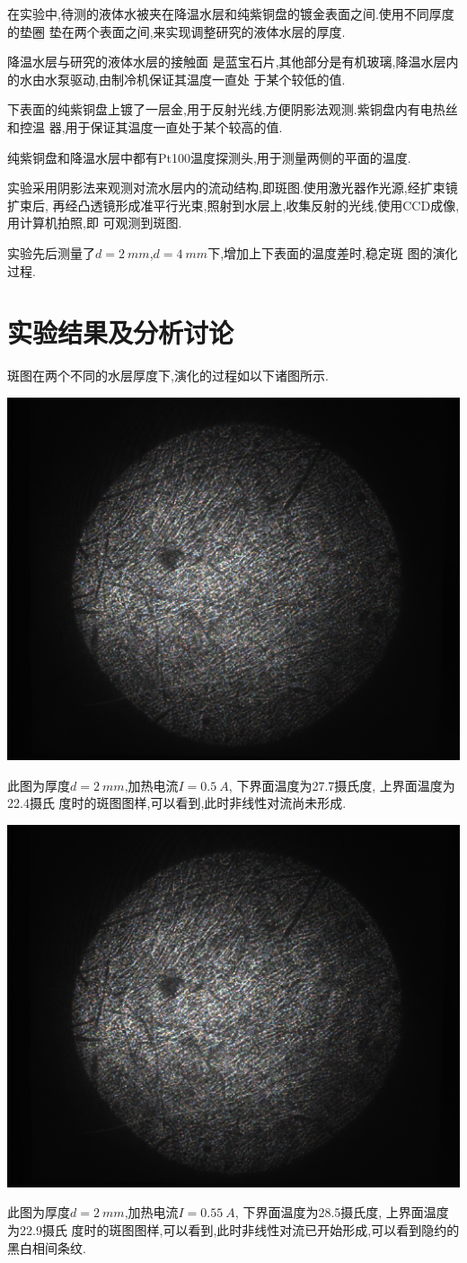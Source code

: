 \documentclass[aps,pre,12pt,preprint,onecolumn,showpacs,showkeys,floatfix]{revtex4-1}
\begin{document}
在实验中,待测的液体水被夹在降温水层和纯紫铜盘的镀金表面之间.使用不同厚度的垫圈
垫在两个表面之间,来实现调整研究的液体水层的厚度.

降温水层与研究的液体水层的接触面
是蓝宝石片,其他部分是有机玻璃,降温水层内的水由水泵驱动,由制冷机保证其温度一直处
于某个较低的值.

下表面的纯紫铜盘上镀了一层金,用于反射光线,方便阴影法观测.紫铜盘内有电热丝和控温
器,用于保证其温度一直处于某个较高的值.

纯紫铜盘和降温水层中都有Pt100温度探测头,用于测量两侧的平面的温度.

实验采用阴影法来观测对流水层内的流动结构,即斑图.使用激光器作光源,经扩束镜扩束后,
再经凸透镜形成准平行光束,照射到水层上,收集反射的光线,使用CCD成像,用计算机拍照,即
可观测到斑图.

实验先后测量了$d = \SI{2}{mm}$,$d = \SI{4}{mm}$下,增加上下表面的温度差时,稳定斑
图的演化过程.

\section{实验结果及分析讨论}

斑图在两个不同的水层厚度下,演化的过程如以下诸图所示.

\begin{center}
    \includegraphics[width=.5\textwidth]{5.20/1.pdf}
\end{center}
    此图为厚度$d=\SI{2}{mm}$,加热电流$I=\SI{0.5}{A}$, 下界面温度为27.7摄氏度, 上界面温度为22.4摄氏
    度时的斑图图样,可以看到,此时非线性对流尚未形成.


\begin{center}
    \includegraphics[width=.5\textwidth]{5.20/2.pdf}
\end{center}
    此图为厚度$d=\SI{2}{mm}$,加热电流$I=\SI{0.55}{A}$, 下界面温度为28.5摄氏度, 上界面温度为22.9摄氏
    度时的斑图图样,可以看到,此时非线性对流已开始形成,可以看到隐约的黑白相间条纹.
\end{document}
